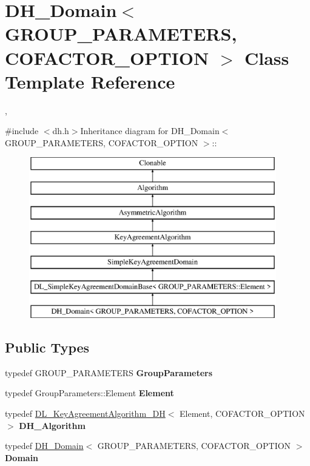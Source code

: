 \hypertarget{class_d_h___domain}{
\section{DH\_\-Domain$<$ GROUP\_\-PARAMETERS, COFACTOR\_\-OPTION $>$ Class Template Reference}
\label{class_d_h___domain}
}


,  


{\ttfamily \#include $<$dh.h$>$}Inheritance diagram for DH\_\-Domain$<$ GROUP\_\-PARAMETERS, COFACTOR\_\-OPTION $>$::\begin{figure}[H]
\begin{center}
\leavevmode
\includegraphics[height=7cm]{class_d_h___domain}
\end{center}
\end{figure}
\subsection*{Public Types}
\begin{DoxyCompactItemize}
\item 
\hypertarget{class_d_h___domain_a15cd83ae62762d11f620209b32683395}{
typedef GROUP\_\-PARAMETERS {\bfseries GroupParameters}}
\label{class_d_h___domain_a15cd83ae62762d11f620209b32683395}

\item 
\hypertarget{class_d_h___domain_a424ed0bb37abd6847628f858ab7c648b}{
typedef GroupParameters::Element {\bfseries Element}}
\label{class_d_h___domain_a424ed0bb37abd6847628f858ab7c648b}

\item 
\hypertarget{class_d_h___domain_a5dfeb223a9e24bedab3b7910a5f58ed1}{
typedef \hyperlink{class_d_l___key_agreement_algorithm___d_h}{DL\_\-KeyAgreementAlgorithm\_\-DH}$<$ Element, COFACTOR\_\-OPTION $>$ {\bfseries DH\_\-Algorithm}}
\label{class_d_h___domain_a5dfeb223a9e24bedab3b7910a5f58ed1}

\item 
\hypertarget{class_d_h___domain_aac36da3372e9e261b1bf4829d0f0e797}{
typedef \hyperlink{class_d_h___domain}{DH\_\-Domain}$<$ GROUP\_\-PARAMETERS, COFACTOR\_\-OPTION $>$ {\bfseries Domain}}
\label{class_d_h___domain_aac36da3372e9e261b1bf4829d0f0e797}

\end{DoxyCompactItemize}
